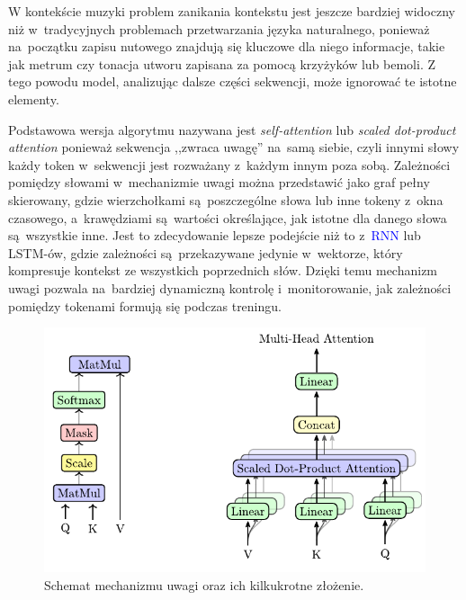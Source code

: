 \documentclass[data-science]{agh-wi} %
\begin{document}
W kontekście muzyki problem zanikania kontekstu jest jeszcze bardziej widoczny niż w~tradycyjnych problemach przetwarzania języka naturalnego, ponieważ na~początku zapisu nutowego znajdują się kluczowe dla niego informacje, takie jak metrum czy tonacja utworu zapisana za pomocą krzyżyków lub bemoli. Z tego powodu model, analizując dalsze części sekwencji, może ignorować te istotne elementy.

Podstawowa wersja algorytmu nazywana jest \textit{self-attention} lub \textit{scaled dot-product attention} ponieważ sekwencja ,,zwraca uwagę'' na~samą siebie, czyli innymi słowy każdy token  w~sekwencji jest rozważany z~każdym innym poza sobą. Zależności pomiędzy słowami w~mechanizmie uwagi można przedstawić jako graf pełny skierowany, gdzie wierzchołkami są~poszczególne słowa lub inne tokeny z~okna czasowego, a~krawędziami są~wartości określające, jak istotne dla danego słowa są~wszystkie inne. Jest to zdecydowanie lepsze podejście niż to z~\textcolor{blue}{RNN} lub LSTM-ów, gdzie zależności są~przekazywane jedynie w~wektorze, który kompresuje kontekst ze wszystkich poprzednich słów. Dzięki temu mechanizm uwagi pozwala na~bardziej dynamiczną kontrolę i~monitorowanie, jak zależności pomiędzy tokenami formują się podczas treningu.


\begin{figure}[ht!]
    \centering
    \includegraphics[width=0.7\linewidth]{./img/attention_heads.pdf}
    \caption{Schemat mechanizmu uwagi oraz ich kilkukrotne złożenie.}\label{fig:attention_heads}
\end{figure}
\end{document}
